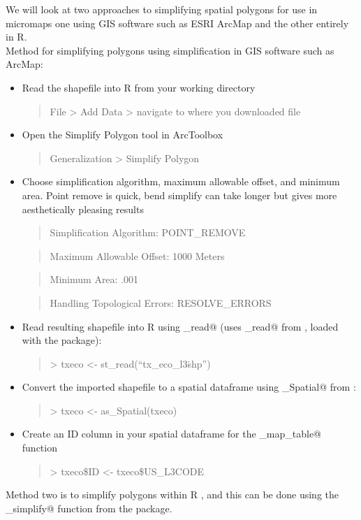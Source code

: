 \documentclass{article}
\newcommand{\R}{{\normalfont\textsf{R }}{}}
\begin{document}
We will look at two approaches to simplifying spatial polygons for use in micromaps \textemdash one using GIS software such as ESRI ArcMap and the other entirely in R.\\
Method for simplifying polygons using simplification in GIS software such as ArcMap:
\begin{itemize}
  \item Read the shapefile into R from your working directory
  \begin{quote}File > Add Data > navigate to where you downloaded file\end{quote}
  \item Open the Simplify Polygon tool in ArcToolbox
  \begin{quote}Generalization > Simplify Polygon\end{quote}
  \item Choose simplification algorithm, maximum allowable offset, and minimum area. Point remove is quick, bend simplify can take longer but gives more aesthetically pleasing results
  \begin{quote}Simplification Algorithm: POINT\_REMOVE\end{quote} 
  \begin{quote}Maximum Allowable Offset: 1000 Meters\end{quote}
  \begin{quote}Minimum Area: .001\end{quote}
  \begin{quote}Handling Topological Errors: RESOLVE\_ERRORS\end{quote} 
  \item Read resulting shapefile into \R using \verb@st_read@ (uses \verb@st_read@ from \verb@sf@, loaded with the \verb@micromap@ package):
  \begin{quote}> txeco <- st\_read(``tx\_eco\_l3\.shp'')\end{quote}
  \item Convert the imported shapefile to a spatial dataframe using \verb@as_Spatial@ from \verb@sf@:
  \begin{quote}> txeco <- as\_Spatial(txeco)\end{quote}
  \item Create an ID column in your spatial dataframe for the \verb@create_map_table@ function
  \begin{quote}> txeco\$ID <- txeco\$US\_L3CODE\end{quote}
  \end{itemize}
Method two is to simplify polygons within \R, and this can be done using the \verb@st_simplify@ function from the \verb@sf@ package.  
\end{document}
